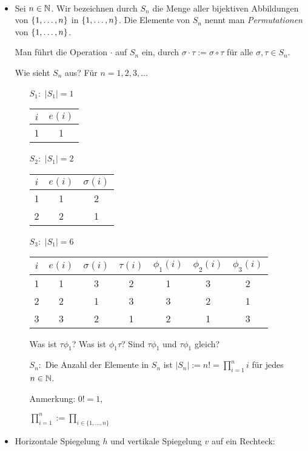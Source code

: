 \begin{bsp}\
\begin{itemize}
	\item Sei $ n \in \mathbb N $. Wir bezeichnen durch $ S_n $ die Menge aller bijektiven Abbildungen von $ \{ 1,\ldots,n \} $ in $ \{ 1,\ldots,n \} $. Die Elemente von $ S_n $ nennt man \emph{Permutationen} von $ \{ 1,\ldots,n \} $.
	
	Man führt die Operation $ \cdot $ auf $ S_n $ ein, durch $ \sigma \cdot \tau := \sigma \circ \tau $ für alle $ \sigma,\tau \in S_n $.
	
	Wie sieht $ S_n $ aus? Für $ n = 1,2,3,\ldots $
	\begin{itemize}
		\item[$ S_1 : $] $ |S_1| = 1 $

		\begin{tabular}{c|c}
			$ i $ & $ e(i) $ \\
			\hline
			1 & 1
		\end{tabular}
		\item[$ S_2 : $] $ |S_1| = 2 $

		\begin{tabular}{c|c|c}
			$ i $ & $ e(i) $ & $ \sigma(i) $ \\
			\hline
			1 & 1 & 2 \\
			2 & 2 & 1
		\end{tabular}
		\item[$ S_3 : $] $ |S_1| = 6 $

		\begin{tabular}{c|c|c|c|c|c|c}
			$ i $ & $ e(i) $ & $ \sigma(i) $ & $ \tau(i) $ & $ \phi_1(i) $ & $ \phi_2(i) $ & $ \phi_3(i) $ \\
			\hline
			1 & 1 & 3 & 2 & 1 & 3 & 2 \\
			2 & 2 & 1 & 3 & 3 & 2 & 1 \\
			3 & 3 & 2 & 1 & 2 & 1 & 3 
		\end{tabular}

		Was ist $ \tau \phi_1 $? 	Was ist $ \phi_1 \tau $? Sind $\tau \phi_1$ und $\tau \phi_1$ gleich? 

		\item[$ S_n : $] Die Anzahl der Elemente in $ S_n $ ist $ |S_n| := n! = \prod\limits_{i=1}^{n}i $ für jedes $ n \in \mathbb N $.

		Anmerkung: $ 0! = 1 $,
		
		$ \prod\limits_{i=1}^{n} := \prod\limits_{i \in \{ 1,\ldots,n \}} $
	\end{itemize}
	
	\item Horizontale Spiegelung $ h $ und vertikale Spiegelung $ v $ auf ein Rechteck:
	

\end{itemize}
\end{bsp}
